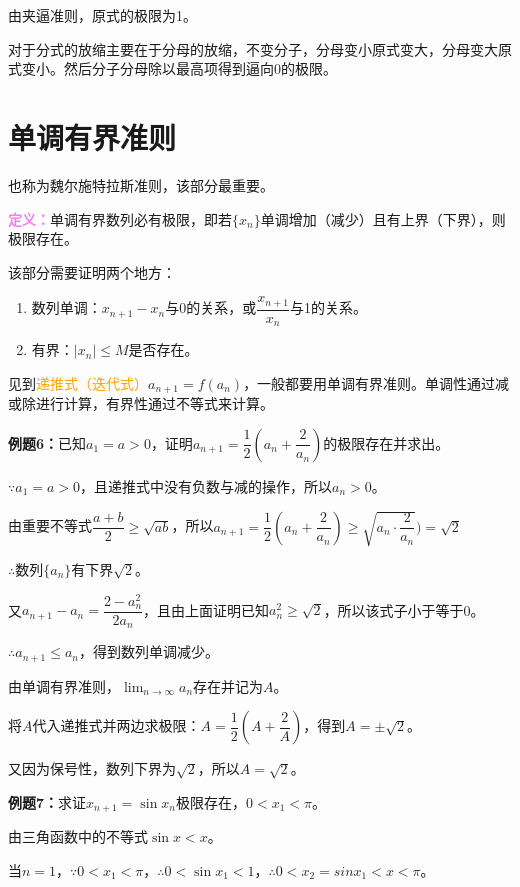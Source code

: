\documentclass[UTF8]{ctexart}
\begin{document}
由夹逼准则，原式的极限为1。

对于分式的放缩主要在于分母的放缩，不变分子，分母变小原式变大，分母变大原式变小。然后分子分母除以最高项得到逼向0的极限。

\section{单调有界准则}

也称为魏尔施特拉斯准则，该部分最重要。

\textcolor{violet}{\textbf{定义：}}单调有界数列必有极限，即若$\{x_n\}$单调增加（减少）且有上界（下界），则极限存在。

该部分需要证明两个地方：

\begin{enumerate}
    \item 数列单调：$x_{n+1}-x_n$与0的关系，或$\dfrac{x_{n+1}}{x_n}$与1的关系。
    \item 有界：$\vert x_n\vert\leqslant M$是否存在。
\end{enumerate}

见到\textcolor{orange}{递推式（迭代式）}$a_{n+1}=f(a_n)$，一般都要用单调有界准则。单调性通过减或除进行计算，有界性通过不等式来计算。

\textbf{例题6：}已知$a_1=a>0$，证明$a_{n+1}=\dfrac{1}{2}\left(a_n+\dfrac{2}{a_n}\right)$的极限存在并求出。

$\because a_1=a>0$，且递推式中没有负数与减的操作，所以$a_n>0$。

由重要不等式$\dfrac{a+b}{2}\geqslant\sqrt{ab}$，所以$a_{n+1}=\dfrac{1}{2}\left(a_n+\dfrac{2}{a_n}\right)\geqslant\sqrt{a_n\cdot\dfrac{2}{a_n}})=\sqrt{2}$

$\therefore$数列$\{a_n\}$有下界$\sqrt{2}$。

又$a_{n+1}-a_n=\dfrac{2-a_n^2}{2a_n}$，且由上面证明已知$a_n^2\geqslant\sqrt{2}$，所以该式子小于等于0。

$\therefore a_{n+1}\leqslant a_n$，得到数列单调减少。

由单调有界准则，$\lim_{n\to\infty}a_n$存在并记为$A$。

将$A$代入递推式并两边求极限：$A=\dfrac{1}{2}(A+\dfrac{2}{A})$，得到$A=\pm\sqrt{2}$。

又因为保号性，数列下界为$\sqrt{2}$，所以$A=\sqrt{2}$。

\textbf{例题7：}求证$x_{n+1}=\sin x_n$极限存在，$0<x_1<\pi$。

由三角函数中的不等式$\sin x<x$。

当$n=1$，$\because 0<x_1<\pi$，$\therefore 0<\sin x_1<1$，$\therefore 0<x_2=sin x_1<x<\pi$。
\end{document}
